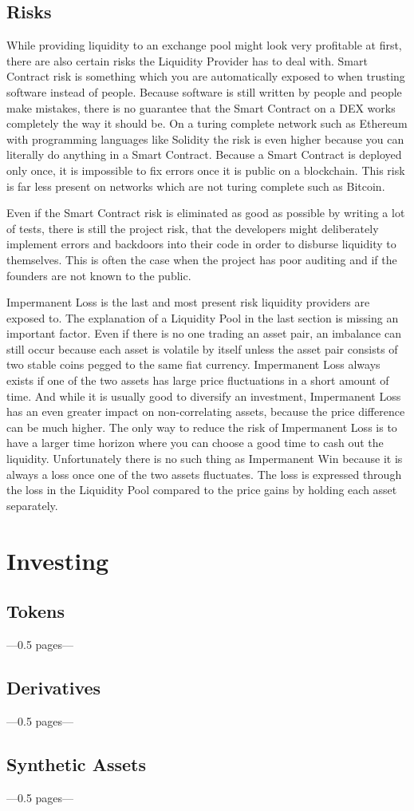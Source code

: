 \subsection{Risks}
While providing liquidity to an exchange pool might look very profitable at first, there are also certain risks the Liquidity Provider has to deal with. Smart Contract risk is something which you are automatically exposed to when trusting software instead of people. Because software is still written by people and people make mistakes, there is no guarantee that the Smart Contract on a DEX works completely the way it should be. On a turing complete network such as Ethereum with programming languages like Solidity the risk is even higher because you can literally do anything in a Smart Contract. Because a Smart Contract is deployed only once, it is impossible to fix errors once it is public on a blockchain. This risk is far less present on networks which are not turing complete such as Bitcoin.

Even if the Smart Contract risk is eliminated as good as possible by writing a lot of tests, there is still the project risk, that the developers might deliberately implement errors and backdoors into their code in order to disburse liquidity to themselves. This is often the case when the project has poor auditing and if the founders are not known to the public.

Impermanent Loss is the last and most present risk liquidity providers are exposed to. The explanation of a Liquidity Pool in the last section is missing an important factor. Even if there is no one trading an asset pair, an imbalance can still occur because each asset is volatile by itself unless the asset pair consists of two stable coins pegged to the same fiat currency. Impermanent Loss always exists if one of the two assets has large price fluctuations in a short amount of time. And while it is usually good to diversify an investment, Impermanent Loss has an even greater impact on non-correlating assets, because the price difference can be much higher. The only way to reduce the risk of Impermanent Loss is to have a larger time horizon where you can choose a good time to cash out the liquidity. Unfortunately there is no such thing as Impermanent Win because it is always a loss once one of the two assets fluctuates. The loss is expressed through the loss in the Liquidity Pool compared to the price gains by holding each asset separately.

\section{Investing}
\subsection{Tokens}
---0.5 pages---
\subsection{Derivatives}
---0.5 pages---
\subsection{Synthetic Assets}
---0.5 pages---

